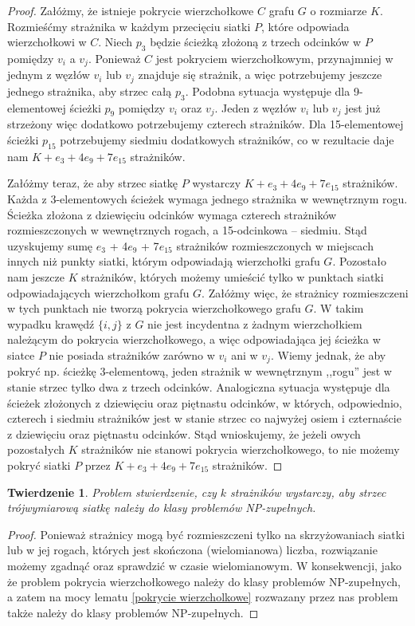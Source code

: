 \documentclass[brudnopis]{xmgr}
\newtheorem{Twierdzenie}{Twierdzenie}
\theoremstyle{definition}
\begin{document}
\begin{proof} 
	Załóżmy, że istnieje pokrycie wierzchołkowe $C$ grafu $G$ o rozmiarze $K$. Rozmieśćmy strażnika w każdym przecięciu siatki $P$, które odpowiada wierzchołkowi w $C$.
	Niech $p_3$ będzie ścieżką złożoną z trzech odcinków w $P$ pomiędzy $v_i$ a $v_j$. Ponieważ $C$ jest pokryciem wierzchołkowym, przynajmniej w jednym z węzłów $v_i$ lub $v_j$ znajduje się strażnik, a więc potrzebujemy jeszcze jednego strażnika, aby strzec całą $p_3$. Podobna sytuacja występuje dla 9-elementowej ścieżki $p_9$ pomiędzy $v_i$ oraz $v_j$. Jeden z węzłów $v_i$ lub $v_j$ jest już strzeżony więc dodatkowo potrzebujemy czterech strażników. Dla 15-elementowej ścieżki $p_{15}$ potrzebujemy siedmiu dodatkowych strażników, co w rezultacie daje nam $K + e_3 + 4e_9 + 7e_{15}$ strażników.

	\indent Załóżmy teraz, że aby strzec siatkę $P$ wystarczy $K + e_3 + 4e_9 + 7e_{15}$ strażników. Każda z 3-elementowych ścieżek wymaga jednego strażnika w wewnętrznym rogu. Ścieżka złożona z dziewięciu odcinków wymaga czterech strażników rozmieszczonych w wewnętrznych rogach, a 15-odcinkowa -- siedmiu. Stąd uzyskujemy sumę $e_3$ + 4$e_9$ + 7$e_{15}$ strażników rozmieszczonych w miejscach innych niż punkty siatki, którym odpowiadają wierzchołki grafu $G$. Pozostało nam jeszcze $K$ strażników, których możemy umieścić tylko w punktach siatki odpowiadających wierzchołkom grafu $G$. Załóżmy więc, że strażnicy rozmieszczeni w tych punktach nie tworzą pokrycia wierzchołkowego grafu $G$. W takim wypadku krawędź $\{i, j\}$ z $G$ nie jest incydentna z żadnym wierzchołkiem należącym do pokrycia wierzchołkowego, a więc odpowiadająca jej ścieżka w siatce $P$ nie posiada strażników zarówno w $v_i$ ani w $v_j$. Wiemy jednak, że aby pokryć np. ścieżkę 3-elementową, jeden strażnik w wewnętrznym ,,rogu'' jest w stanie strzec tylko dwa z trzech odcinków. Analogiczna sytuacja występuje dla ścieżek złożonych z dziewięciu oraz piętnastu odcinków, w których, odpowiednio, czterech i siedmiu strażników jest w stanie strzec co najwyżej osiem i czternaście z dziewięciu oraz piętnastu odcinków. Stąd wnioskujemy, że jeżeli owych pozostałych $K$ strażników nie stanowi pokrycia wierzchołkowego, to nie możemy pokryć siatki $P$ przez $K + e_3 + 4e_9 + 7e_{15}$ strażników. 
\end{proof}

\begin{Twierdzenie} \cite{ntafos}
  Problem stwierdzenie, czy $k$ strażników wystarczy, aby strzec trójwymiarową siatkę należy do klasy problemów NP-zupełnych.
\end{Twierdzenie}
\begin{proof} 
	Ponieważ strażnicy mogą być rozmieszczeni tylko na skrzyżowaniach siatki lub w jej rogach, których jest skończona (wielomianowa) liczba, rozwiązanie możemy zgadnąć oraz sprawdzić w czasie wielomianowym. W konsekwencji, jako że problem pokrycia wierzchołkowego należy do klasy problemów NP-zupełnych, a zatem na mocy lematu \ref{pokrycie wierzcholkowe} rozwazany przez nas problem także należy do klasy problemów NP-zupełnych.
\end{proof}
\end{document}
